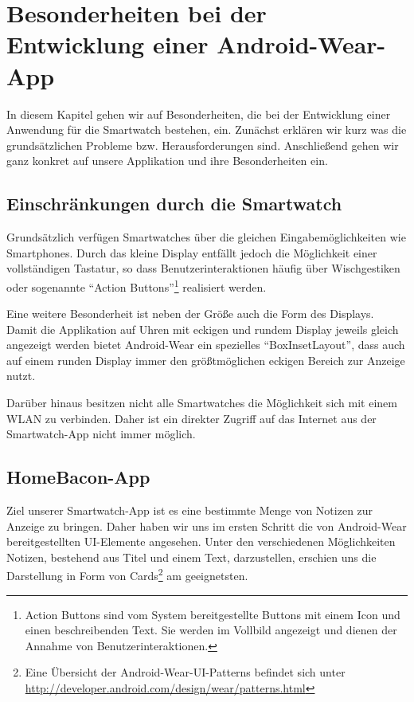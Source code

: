 \section{Besonderheiten bei der Entwicklung einer Android-Wear-App}
In diesem Kapitel gehen wir auf Besonderheiten, die bei der Entwicklung einer Anwendung für die Smartwatch bestehen, ein. Zunächst erklären wir kurz was die grundsätzlichen Probleme bzw. Herausforderungen sind. Anschließend gehen wir ganz konkret auf unsere Applikation und ihre Besonderheiten ein.

\subsection{Einschränkungen durch die Smartwatch}
Grundsätzlich verfügen Smartwatches über die gleichen Eingabemöglichkeiten wie Smartphones. Durch das kleine Display entfällt jedoch die Möglichkeit einer vollständigen Tastatur, so dass Benutzerinteraktionen häufig über Wischgestiken oder sogenannte "`Action Buttons"'\footnote{Action Buttons sind vom System bereitgestellte Buttons mit einem Icon und einen beschreibenden Text. Sie werden im Vollbild angezeigt und dienen der Annahme von Benutzerinteraktionen.} realisiert werden. 

Eine weitere Besonderheit ist neben der Größe auch die Form des Displays. Damit die Applikation auf Uhren mit eckigen und rundem Display jeweils gleich angezeigt werden bietet Android-Wear ein spezielles "`BoxInsetLayout"', dass auch auf einem runden Display immer den größtmöglichen eckigen Bereich zur Anzeige nutzt.

Darüber hinaus besitzen nicht alle Smartwatches die Möglichkeit sich mit einem WLAN zu verbinden. Daher ist ein direkter Zugriff auf das Internet aus der Smartwatch-App nicht immer möglich.

\subsection{HomeBacon-App}
Ziel unserer Smartwatch-App ist es eine bestimmte Menge von Notizen zur Anzeige zu bringen. Daher haben wir uns im ersten Schritt die von Android-Wear bereitgestellten UI-Elemente angesehen. Unter den verschiedenen Möglichkeiten Notizen, bestehend aus Titel und einem Text, darzustellen, erschien uns die Darstellung in Form von Cards\footnote{Eine Übersicht der Android-Wear-UI-Patterns befindet sich unter \url{http://developer.android.com/design/wear/patterns.html}} am geeignetsten.

